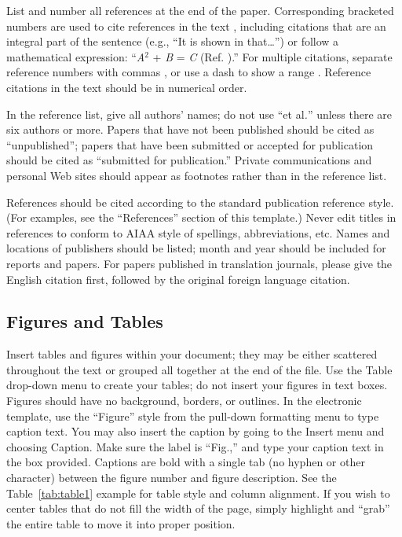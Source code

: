 \documentclass{AIAA}
\begin{document}
List and number all references at the end of the paper. Corresponding bracketed numbers are used to cite references in the text \cite{1}, including citations that are an integral part of the sentence (e.g., ``It is shown in \cite{2} that\ldots '') or follow a mathematical expression: ``\textit{A}$^{2}$ + \textit{B} = \textit{C} (Ref. \cite{3}).'' For multiple citations, separate reference numbers with commas \cite{4,5}, or use a dash to show a range \cite{6,7,8}. Reference citations in the text should be in numerical order.

In the reference list, give all authors' names; do not use ``et al\textit{.}'' unless there are six authors or more. Papers that have not been published should be cited as ``unpublished''; papers that have been submitted or accepted for publication should be cited as ``submitted for publication.'' Private communications and personal Web sites should appear as footnotes rather than in the reference list.

References should be cited according to the standard publication reference style. (For examples, see the ``References'' section of this template.) Never edit titles in references to conform to AIAA style of spellings, abbreviations, etc. Names and locations of publishers should be listed; month and year should be included for reports and papers. For papers published in translation journals, please give the English citation first, followed by the original foreign language citation.

\subsection{Figures and Tables}
Insert tables and figures within your document; they may be either scattered throughout the text or grouped all together at the end of the file. Use the Table drop-down menu to create your tables; do not insert your figures in text boxes. Figures should have no background, borders, or outlines. In the electronic template, use the ``Figure'' style from the pull-down formatting menu to type caption text. You may also insert the caption by going to the Insert menu and choosing Caption. Make sure the label is ``Fig.,'' and type your caption text in the box provided. Captions are bold with a single tab (no hyphen or other character) between the figure number and figure description. See the Table~\ref{tab:table1} example for table style and column alignment. If you wish to center tables that do not fill the width of the page, simply highlight and ``grab'' the entire table to move it into proper position.
\end{document}
